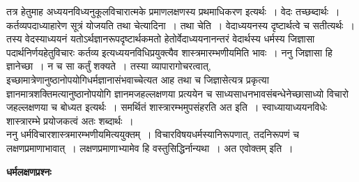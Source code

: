 \documentclass[11pt, openany]{book}
\begin{document}
 तत्र हेतुमाह अध्ययनविध्यनुकूलविचारात्मके प्रमाणलक्षणस्य प्रथमाधिकरण इत्यर्थः~। वेदः
तच्छब्दार्थः~। कर्तव्यपदाध्याहारेण सूत्रं योजयति {\br तथा चेत्यादिना~। तथा चेति~।} वेदाध्ययनस्य दृष्टार्थत्वे च सतीत्यर्थः~। तस्य वेदस्याध्ययनं यतोऽर्थज्ञानरूपदृष्टार्थकमतो हेतोर्वेदाध्ययनानन्तरं वेदार्थस्य धर्मस्य जिज्ञासा पदार्थनिर्णयहेतुविचारः कर्तव्य इत्यध्ययनविधिप्रयुक्त्यैव शास्त्रमारम्भणीयमिति भावः~। {\br ननु} जिज्ञासा हि ज्ञानेच्छा~। न च सा कर्तुं शक्यते~। तस्या व्यापारागोचरत्वात्, इच्छामात्रेणानुष्ठानोपयोगिधर्मज्ञानासंभवाच्चेत्यत आह तथा च जिज्ञासेत्यत्र प्रकृत्या
ज्ञानमात्रशक्तिमत्यानुष्ठानोपयोगि ज्ञानमजहल्लक्षणया प्रत्ययेन च साध्यसाधनभावसंबन्धेनेच्छासाध्यो विचारो जहल्लक्षणया च बोध्यत इत्यर्थः~। समर्थितं शास्त्रारम्भमुपसंहरति {\br अत इति~।} स्वाध्यायाध्ययनविधेः शास्त्रारम्भे प्रयोजकत्वं {\qt अतः} शब्दार्थः~।~\\

  {\br ननु} धर्मविचारशास्त्रमारम्भणीयमित्ययुक्तम्~। विचारविषयधर्मस्यानिरूपणात्, तदनिरूपणं च लक्षणप्रमाणाभावात्~। लक्षणप्रमाणाभ्यामेव हि वस्तुसिद्धिर्नान्यथा~। अत एवोक्तम् इति~।
\newpage
\fancyhead[RE]{[ धर्मलक्षण\textemdash\ }
\begin{center}
\textbf{धर्मलक्षणप्रश्नः}
\end{center}
\end{document}
